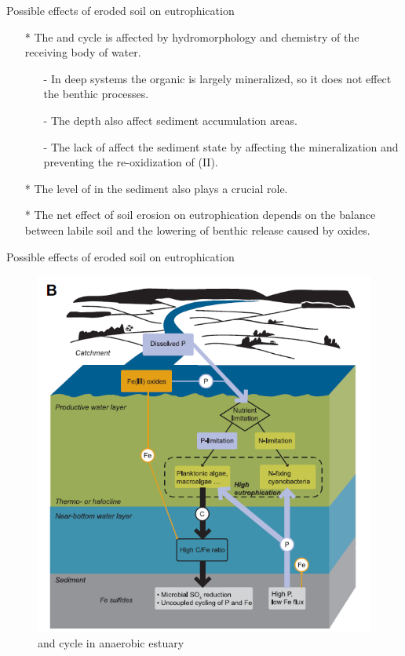 \documentclass{beamer}
\begin{document}
  \begin{frame}{Possible effects of eroded soil on eutrophication}
  \begin{itemize}
    \item[*] The  and  cycle is affected by hydromorphology and chemistry of the receiving body of water.
    \begin{itemize}
      \item[-] In deep systems the organic  is largely mineralized, so it does not effect the benthic processes.
      \item[-] The depth also affect sediment accumulation areas.
      \item[-] The lack of  affect the sediment state by affecting the mineralization and preventing the re-oxidization of (II).  
    \end{itemize}
    \item[*] The level of  in the sediment also plays a crucial role.
    \item[*] The net effect of soil erosion on eutrophication depends on the balance between labile soil  and the lowering of benthic  release caused by  oxides.
  \end{itemize}
  \end{frame}
  
  \begin{frame}{Possible effects of eroded soil on eutrophication}
    \begin{figure}
      \centering
      \includegraphics[scale=0.31]{../Kuvat/eutrophication_B.png}  
      \caption{\footnotesize{ and  cycle in anaerobic estuary}}   
    \end{figure}
  \end{frame}
  
\end{document}
